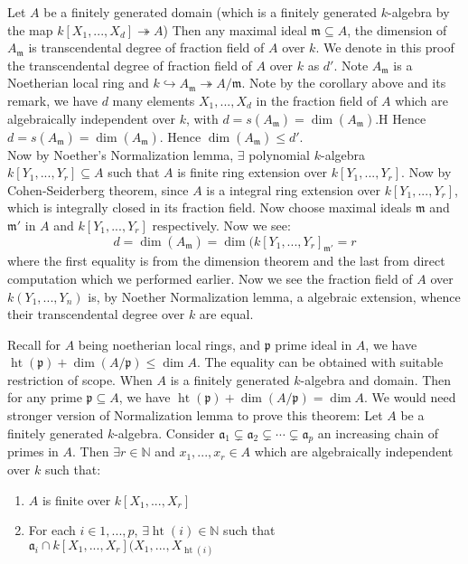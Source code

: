 \documentclass[12pt]{article}
\theoremstyle{definition}
\theoremstyle{plain}
\DeclareMathOperator{\Ht}{ht}
\newcommand{\nat}{\mathbb{N}}
\newcommand{\inj}{\hookrightarrow}
\newcommand{\surj}{\twoheadrightarrow}
\begin{document}
\medskip
\Theo Let $A$ be a finitely generated domain (which is a finitely generated $k$-algebra by the map $k[X_1, ..., X_d]\surj A$) Then any maximal ideal $\mathfrak{m}\subseteq A$, the dimension of $A_\mathfrak{m}$ is transcendental degree of fraction field of $A$ over $k$.
\proof We denote in this proof the transcendental degree of fraction field of $A$ over $k$ as $d'$. Note $A_\mathfrak{m}$ is a Noetherian local ring and $k\inj A_\mathfrak{m} \surj A/\mathfrak{m}$. Note by the corollary above and its remark, we have $d$ many elements $X_1, ..., X_d$ in the fraction field of $A$ which are algebraically independent over $k$, with $d=s(A_\mathfrak{m})=\dim(A_\mathfrak{m})$.H Hence $d=s(A_\mathfrak{m})=\dim(A_\mathfrak{m})$. Hence $\dim(A_\mathfrak{m})\leq d'$.\\
\indent Now by Noether's Normalization lemma, $\exists$ polynomial $k$-algebra $k[Y_1, ..., Y_r]\subseteq A$ such that $A$ is finite ring extension over $k[Y_1, ..., Y_r]$. Now by Cohen-Seiderberg theorem, since $A$ is a integral ring extension over $k[Y_1, ..., Y_r]$, which is integrally closed in its fraction field. Now choose maximal ideals $\mathfrak{m}$ and $\mathfrak{m}'$ in $A$ and $k[Y_1, ..., Y_r]$ respectively. Now we see:
\[d=\dim(A_\mathfrak{m})=\dim(k[Y_1, ..., Y_r]_{\mathfrak{m}'}=r\]
where the first equality is from the dimension theorem and the last from direct computation which we performed earlier. Now we see the fraction field of $A$ over $k(Y_1, ..., Y_n)$ is, by Noether Normalization lemma, a algebraic extension, whence their transcendental degree over $k$ are equal. \qedhere

\medskip
Recall for $A$ being noetherian local rings, and $\mathfrak{p}$ prime ideal in $A$, we have $\Ht(\mathfrak{p})+\dim(A/\mathfrak{p})\leq \dim A$. The equality can be obtained with suitable restriction of scope.
\Theo When $A$ is a finitely generated $k$-algebra and domain. Then for any prime $\mathfrak{p}\subseteq A$, we have $\Ht(\mathfrak{p})+\dim(A/\mathfrak{p})=\dim A$.
\proof We would need stronger version of Normalization lemma to prove this theorem:
\Lemma Let $A$ be a finitely generated $k$-algebra. Consider $\mathfrak{a}_1\subsetneq \mathfrak{a}_2\subsetneq \cdots \subsetneq \mathfrak{a}_p$ an increasing chain of primes in $A$. Then $\exists r\in \nat$ and $x_1, ..., x_r\in A$ which are algebraically independent over $k$ such that:
\begin{enumerate}
  \item $A$ is finite over $k[X_1, ..., X_r]$
  \item For each $i\in {1,...,p}$, $\exists \Ht(i)\in \nat$ such that $\mathfrak{a}_i\cap k[X_1, ..., X_r](X_1, ..., X_{\Ht(i)}$
\end{enumerate}
\end{document}
